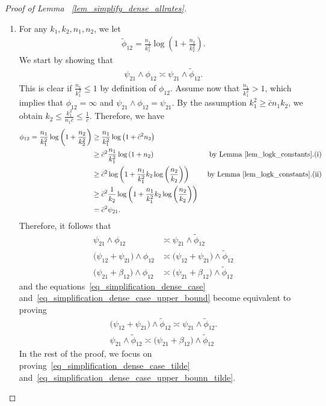 \documentclass{article}
\begin{document}
\begin{proof}[Proof of Lemma ~\ref{lem_simplify_dense_allrates}]
\phantom{}

\begin{enumerate}
    \item 
For any $k_1,k_2, n_1, n_2$, we let 
\begin{align*}
    \widetilde \phi_{12} = \frac{n_1}{k_1^2} \log\left(1+\frac{n_2}{k_2^2}\right).
\end{align*}
We start by showing that 
\begin{align*}
    \psi_{21} \land \phi_{12} \asymp \psi_{21} \land \widetilde \phi_{12}.
\end{align*}
This is clear if $\frac{n_1}{k_1^2} \leq 1$ by definition of $\phi_{12}$.  
Assume now that $\frac{n_1}{k_1^2} >1$, which implies that $\phi_{12} = \infty$ and $\psi_{21} \land \phi_{12} = \psi_{21}$. 
By the assumption $k_1^2 \geq \bar c n_1 k_2$, we obtain $k_2 \leq \frac{k_1^2}{n_1\bar c} \leq \frac{1}{\bar c}$. 
Therefore, we have
\begin{align*}
    \phi_{12} = \frac{n_1}{k_1^2} \log\left(1+\frac{n_2}{k_2^2}\right) &\geq \frac{n_1}{k_1^2} \log\left(1+\bar c^2 n_2\right)& \\
    &\geq \bar c^2\frac{n_1}{k_1^2} \log\left(1+n_2\right) &\text{ by Lemma~\ref{lem_logk_constants}.(i)}\\
    & \geq \bar c^2\log\left(1+\frac{n_1}{k_1^2} k_2\log\left(\frac{n_2}{k_2}\right)\right)  & \text{ by Lemma~\ref{lem_logk_constants}.(ii)}\\
    & \geq \bar c^2\frac{1}{k_2}\log\left(1+\frac{n_1}{k_1^2} k_2\log\left(\frac{n_2}{k_2}\right)\right) &\\
    & = \bar c^2 \psi_{21}.&
\end{align*}
Therefore, it follows that
\begin{align*}
    \psi_{21} \land \phi_{12} &\asymp \psi_{21} \land \widetilde \phi_{12}\\
    \Big(\psi_{12} + \psi_{21}\Big) \land \phi_{12} &\asymp\Big(\psi_{12} + \psi_{21}\Big) \land \widetilde \phi_{12}\\
    \Big(\psi_{21} + \beta_{12}\Big) \land \phi_{12} & \asymp \Big(\psi_{21} + \beta_{12}\Big) \land \widetilde \phi_{12} 
\end{align*}
and the equations~\eqref{eq_simplification_dense_case} and~\eqref{eq_simplification_dense_case_upper_bound} become equivalent to proving
\begin{align}
\Big(\psi_{12} + \psi_{21}\Big) \land \widetilde \phi_{12}
        \asymp \psi_{21} \land \widetilde \phi_{12}.\label{eq_simplification_dense_case_tilde}\\
\psi_{21} \land \widetilde \phi_{12}
        \asymp \Big(\psi_{21} + \beta_{12}\Big) \land \widetilde \phi_{12}\label{eq_simplification_dense_case_upper_bounn_tilde}
\end{align}
In the rest of the proof, we focus on proving~\eqref{eq_simplification_dense_case_tilde} and~\eqref{eq_simplification_dense_case_upper_bounn_tilde}.
    

\end{enumerate}
\end{proof}
\end{document}
